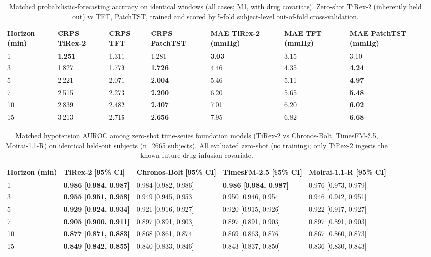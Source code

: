 \documentclass[10pt]{article}
\begin{document}
\begin{table}[H]\centering\footnotesize
\caption{Matched probabilistic-forecasting accuracy on identical windows (all cases; M1, with drug covariate). Zero-shot TiRex-2 (inherently held out) vs TFT, PatchTST, trained and scored by 5-fold subject-level out-of-fold cross-validation.}
\begin{adjustbox}{max width=\textwidth}
\begin{tabular}{lllllll}
\toprule
\textbf{Horizon (min)} & \textbf{CRPS TiRex-2} & \textbf{CRPS TFT} & \textbf{CRPS PatchTST} & \textbf{MAE TiRex-2 (mmHg)} & \textbf{MAE TFT (mmHg)} & \textbf{MAE PatchTST (mmHg)} \\
\midrule
1 & \textbf{1.251} & 1.311 & 1.281 & \textbf{3.03} & 3.15 & 3.10 \\
3 & 1.827 & 1.779 & \textbf{1.726} & 4.46 & 4.35 & \textbf{4.24} \\
5 & 2.221 & 2.071 & \textbf{2.004} & 5.46 & 5.11 & \textbf{4.97} \\
7 & 2.515 & 2.273 & \textbf{2.200} & 6.20 & 5.65 & \textbf{5.48} \\
10 & 2.839 & 2.482 & \textbf{2.407} & 7.01 & 6.20 & \textbf{6.02} \\
15 & 3.213 & 2.716 & \textbf{2.656} & 7.95 & 6.82 & \textbf{6.68} \\
\bottomrule
\end{tabular}
\end{adjustbox}
\end{table}

\begin{table}[H]\centering\footnotesize
\caption{Matched hypotension AUROC among zero-shot time-series foundation models (TiRex-2 vs Chronos-Bolt, TimesFM-2.5, Moirai-1.1-R) on identical held-out subjects (n=2665 subjects). All evaluated zero-shot (no training); only TiRex-2 ingests the known future drug-infusion covariate.}
\begin{adjustbox}{max width=\textwidth}
\begin{tabular}{lllll}
\toprule
\textbf{Horizon (min)} & \textbf{TiRex-2 [95\% CI]} & \textbf{Chronos-Bolt [95\% CI]} & \textbf{TimesFM-2.5 [95\% CI]} & \textbf{Moirai-1.1-R [95\% CI]} \\
\midrule
1 & \textbf{0.986 [0.984, 0.987]} & 0.984 [0.982, 0.986] & \textbf{0.986 [0.984, 0.987]} & 0.976 [0.973, 0.979] \\
3 & \textbf{0.955 [0.951, 0.958]} & 0.949 [0.945, 0.953] & 0.950 [0.946, 0.954] & 0.946 [0.942, 0.951] \\
5 & \textbf{0.929 [0.924, 0.934]} & 0.921 [0.916, 0.927] & 0.920 [0.915, 0.926] & 0.922 [0.917, 0.927] \\
7 & \textbf{0.905 [0.900, 0.911]} & 0.897 [0.891, 0.903] & 0.897 [0.891, 0.903] & 0.897 [0.891, 0.903] \\
10 & \textbf{0.877 [0.871, 0.883]} & 0.868 [0.861, 0.874] & 0.869 [0.863, 0.876] & 0.867 [0.860, 0.873] \\
15 & \textbf{0.849 [0.842, 0.855]} & 0.840 [0.833, 0.846] & 0.843 [0.837, 0.850] & 0.836 [0.830, 0.843] \\
\bottomrule
\end{tabular}
\end{adjustbox}
\end{table}
\end{document}
